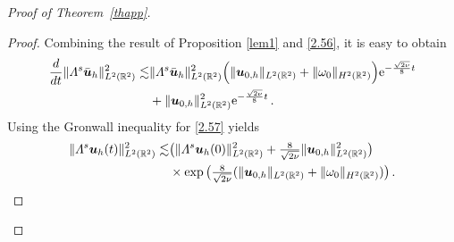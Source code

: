 \documentclass[pdflatex,sn-mathphys-num]{sn-jnl}%
\theoremstyle{thmstyleone}%
\theoremstyle{thmstyletwo}%
\theoremstyle{thmstylethree}%
\theoremstyle{thmstyletwo}
\begin{document}
\begin{proof}[Proof of Theorem~{\upshape\ref{thapp}}]
\begin{proof}
	
	
	
	
	Combining the result of Proposition \ref{lem1} and  \eqref{2.56}, it is easy to obtain 
	\begin{align}\label{2.57}
		\frac{d}{dt}\lVert\varLambda^s\bar {\boldsymbol u}_h\rVert_{L^2(\mathbb{R}^2)}^2	
		\lesssim&
		\lVert\varLambda^s\bar{\boldsymbol u}_h\rVert_{L^2(\mathbb{R}^2)}^2
		\Big(\lVert{\boldsymbol{u}}_{0,h}\rVert_{L^2(\mathbb{R}^2)}+\lVert{\omega}_0\rVert_{H^2(\mathbb{R}^2)}\Big) \mathrm{e}^{-\frac{\sqrt{2\nu}}{8}  t}\notag\\
		&+\lVert{\boldsymbol{u}}_{0,h}\rVert_{L^2(\mathbb{R}^2)}^2 \mathrm{e}^{-\frac{\sqrt{2\nu}}{8}  t}
		\,.
	\end{align}	
	Using the Gronwall inequality for \eqref{2.57} yields
	\begin{align}\label{2.58}
		\lVert\varLambda^s {\boldsymbol u}_h(t)\rVert_{L^2(\mathbb{R}^2)}^2	
		\lesssim&
		\big(
		\lVert\varLambda^s {\boldsymbol u}_{h}(0)\rVert_{L^2(\mathbb{R}^2)}^2	
		+
		\tfrac{8}{\sqrt{2\nu}}
		\lVert{\boldsymbol{u}}_{0,h}\rVert_{L^2(\mathbb{R}^2)}^2
		\big)\notag\\
		&\times
		\exp
		\big(
		\tfrac{8}{\sqrt{2\nu}}(\lVert{\boldsymbol{u}}_{0,h}\rVert_{L^2(\mathbb{R}^2)}+\lVert{\omega}_0\rVert_{H^2(\mathbb{R}^2)})
		\big)\,.
	\end{align}	
	

\end{proof}
\end{proof}
\end{document}
